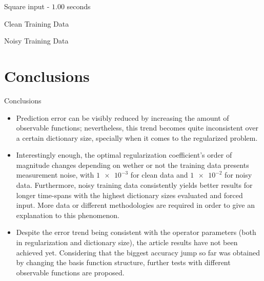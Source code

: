 \documentclass{beamer}
\begin{document}
\begin{frame}{Square input - $1.00$ seconds}
    \scriptsize
    \begin{table}[!ht]
        \centering
        \caption{Clean Training Data}
    \end{table}

    \begin{table}[!ht]
        \centering
        \caption{Noisy Training Data}
    \end{table}
\end{frame}


\section{Conclusions}

\begin{frame}[allowframebreaks]{Conclusions}
    \begin{itemize}
        \item Prediction error can be visibly reduced by increasing the amount of observable functions; nevertheless, this trend becomes quite inconsistent over a certain dictionary size, specially when it comes to the regularized problem.
        \item Interestingly enough, the optimal regularization coefficient's order of magnitude changes depending on wether or not the training data presents measurement noise, with $\num{1e-3}$ for clean data and $\num{1e-2}$ for noisy data. Furthermore, noisy training data consistently yields better results for longer time-spans with the highest dictionary sizes evaluated and forced input. More data or different methodologies are required in order to give an explanation to this phenomenon.
        \item Despite the error trend being consistent with the operator parameters (both in regularization and dictionary size), the article results have not been achieved yet. Considering that the biggest accuracy jump so far was obtained by changing the basis function structure, further tests with different observable functions are proposed.
    \end{itemize}
\end{frame}
\end{document}
